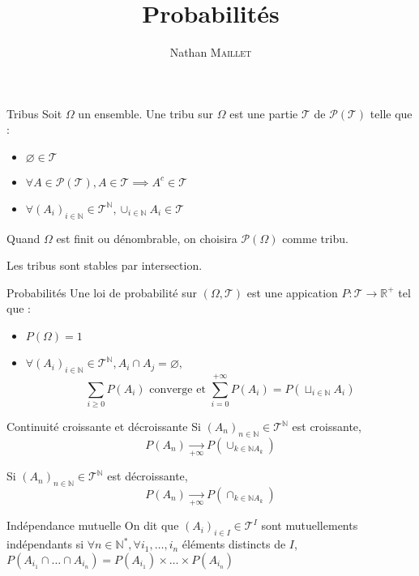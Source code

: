 \documentclass[french, a4paper, 10pt, twocolumn]{article}
\title{Probabilités}
\author{Nathan \textsc{Maillet}}
\date{}
\newcommand{\limit}[1]{\underset{#1}{\rightarrow}}  %
\newcommand{\N}{\mathbb{N}}   %
\newcommand{\R}{\mathbb{R}}   %
\begin{document}
\maketitle

\begin{definition}{Tribus}
    Soit \(\Omega\) un ensemble.
    Une tribu sur \(\Omega\) est une partie \(\mathcal{T}\) de \(\mathcal{P(T)}\) telle que :
        \begin{itemize}
            \item \(\varnothing \in \mathcal{T}\)
            \item \(\forall A \in \mathcal{P(T)}, A \in \mathcal{T} \implies A^c \in  \mathcal{T}\)
            \item \(\forall (A_i)_{i\in \N} \in \mathcal{T}^{\N}, \cup_{i\in \N}A_i \in \mathcal{T}\)
        \end{itemize}
    \tcblower
    Quand \(\Omega\) est finit ou dénombrable, on choisira \(\mathcal{P(\Omega)}\) comme tribu.

    Les tribus sont stables par intersection.
\end{definition}

\begin{definition}{Probabilités}
    Une loi de probabilité sur $(\Omega,\mathcal{T})$ est une appication \(P : \mathcal{T} \rightarrow \R^+\) tel que :
    \begin{itemize}
        \item \(P(\Omega)=1\)
        \item \(\forall (A_i)_{i\in \N} \in \mathcal{T}^{\N}, A_i\cap A_j =\varnothing,\)
        \[\sum_{i\geq 0}^{}P(A_i) \text{ converge et } \sum_{i=0}^{+\infty}P(A_i)=P(\sqcup_{i\in \N}A_i)\] 
    \end{itemize}
\end{definition}

\begin{theoreme}{Continuité croissante et décroissante}
    Si \((A_n)_{n\in \N} \in \mathcal{T}^{\N}\) est croissante, \[P(A_n)\limit{+\infty}P(\cup_{k\in \N A_k})\]
    
    Si \((A_n)_{n\in \N} \in \mathcal{T}^{\N}\) est décroissante, \[P(A_n)\limit{+\infty}P(\cap_{k\in \N A_k})\]
\end{theoreme}

\begin{definition}{Indépendance mutuelle}
    On dit que \((A_i)_{i \in I} \in \mathcal{T}^I\) sont mutuellements indépendants si \(\forall n \in \N^*, \forall i_1,\dots,i_n\)
    éléments distincts de \(I\), \(P(A_{i_1}\cap\dots\cap A_{i_n})=P(A_{i_1})\times\dots\times P(A_{i_n})\)
\end{definition}
\end{document}
